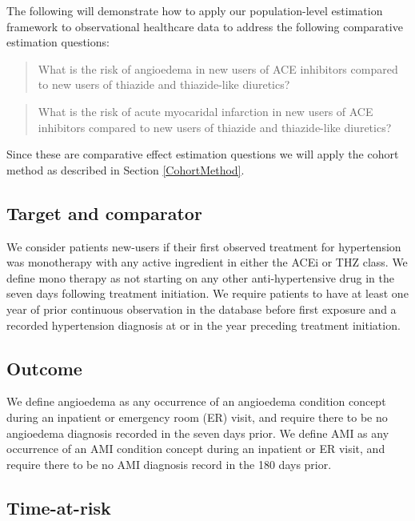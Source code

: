 \documentclass[11pt]{book}
\begin{document}
The following will demonstrate how to apply our population-level
estimation framework to observational healthcare data to address the
following comparative estimation questions:

\begin{quote}
What is the risk of angioedema in new users of ACE inhibitors compared
to new users of thiazide and thiazide-like diuretics?
\end{quote}

\begin{quote}
What is the risk of acute myocaridal infarction in new users of ACE
inhibitors compared to new users of thiazide and thiazide-like
diuretics?
\end{quote}

Since these are comparative effect estimation questions we will apply
the cohort method as described in Section \ref{CohortMethod}.

\subsection{Target and comparator}\label{target-and-comparator}

We consider patients new-users if their first observed treatment for
hypertension was monotherapy with any active ingredient in either the
ACEi or THZ class. We define mono therapy as not starting on any other
anti-hypertensive drug in the seven days following treatment initiation.
We require patients to have at least one year of prior continuous
observation in the database before first exposure and a recorded
hypertension diagnosis at or in the year preceding treatment initiation.

\subsection{Outcome}\label{outcome-1}

We define angioedema as any occurrence of an angioedema condition
concept during an inpatient or emergency room (ER) visit, and require
there to be no angioedema diagnosis recorded in the seven days prior. We
define AMI as any occurrence of an AMI condition concept during an
inpatient or ER visit, and require there to be no AMI diagnosis record
in the 180 days prior.

\subsection{Time-at-risk}\label{time-at-risk-1}
\end{document}
